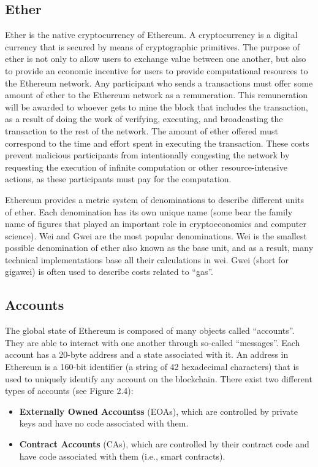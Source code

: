     \subsection{Ether}
        Ether is the native cryptocurrency of Ethereum.
        A cryptocurrency is a digital currency that is secured by means of cryptographic primitives.
        The purpose of ether is not only to allow users to exchange value between one another, but also to provide an economic incentive for users to provide computational resources to the Ethereum network.
        Any participant who sends a transactions must offer some amount of ether to the Ethereum network as a remuneration.
        This remuneration will be awarded to whoever gets to mine the block that includes the transaction, as a result of doing the work of verifying, executing, and broadcasting the transaction to the rest of the network.
        The amount of ether offered must correspond to the time and effort spent in executing the transaction.
        These costs prevent malicious participants from intentionally congesting the network by requesting the execution of infinite computation or other resource-intensive actions, as these participants must pay for the computation.

        Ethereum provides a metric system of denominations to describe different units of ether.
        Each denomination has its own unique name (some bear the family name of figures that played an important role in cryptoeconomics and computer science).
        Wei and Gwei are the most popular denominations.
        Wei is the smallest possible denomination of ether also known as the base unit, and as a result, many technical implementations base all their calculations in wei.
        Gwei (short for gigawei) is often used to describe costs related to “gas”.

    \subsection{Accounts}
        The global state of Ethereum is composed of many objects called “accounts”.
        They are able to interact with one another through so-called “messages”.
        Each account has a 20-byte address and a state associated with it.
        An address in Ethereum is a 160-bit identifier (a string of 42 hexadecimal characters) that is used to uniquely identify any account on the blockchain.
        There exist two different types of accounts (see Figure 2.4):
        \begin{itemize}
            \item \textbf{Externally Owned Accountss} (EOAs), which are controlled by private keys and have no code associated with them.
            \item \textbf{Contract Accounts} (CAs), which are controlled by their contract code and have code associated with them (i.e., smart contracts).
        \end{itemize}

